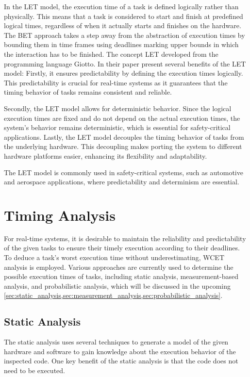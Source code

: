 In the \ac{LET} model, the execution time of a task is defined logically rather than physically. This means that a task is considered to start and finish at predefined logical times, regardless of when it actually starts and finishes on the hardware\cite{chakrabortyAdvancesRealTimeSystems2012}.
The \ac{BET} approach takes a step away from the abstraction of execution times by bounding them in time frames using deadlines marking upper bounds in which the interaction has to be finished\cite{chakrabortyAdvancesRealTimeSystems2012}.
The concept \ac{LET} developed from the programming language Giotto\cite{henzingerGiottoTimetriggeredLanguage2003}.
In their paper \textcite{henzingerGiottoTimetriggeredLanguage2003} present several benefits of the \ac{LET} model:
Firstly, it ensures predictability by defining the execution times logically.
This predictability is crucial for real-time systems as it guarantees that the timing behavior of tasks remains consistent and reliable.

Secondly, the \ac{LET} model allows for deterministic behavior.
Since the logical execution times are fixed and do not depend on the actual execution times, the system's behavior remains deterministic, which is essential for safety-critical applications.
Lastly, the \ac{LET} model decouples the timing behavior of tasks from the underlying hardware.
This decoupling makes porting the system to different hardware platforms easier, enhancing its flexibility and adaptability.

The \ac{LET} model is commonly used in safety-critical systems, such as automotive and aerospace applications, where predictability and determinism are essential.

\section{Timing Analysis}\label{sec:timing_analysis}
For real-time systems, it is desirable to maintain the reliability and predictability of the given tasks to ensure their timely execution according to their deadlines.
To deduce a task's worst execution time without underestimating, \ac{WCET} analysis is employed.
Various approaches are currently used to determine the possible execution times of tasks, including static analysis, measurement-based analysis, and probabilistic analysis, which will be discussed in the upcoming \cref{sec:static_analysis,sec:measurement_analysis,sec:probabilistic_analysis}.

\subsection{Static Analysis}\label{sec:static_analysis}
The static analysis uses several techniques to generate a model of the given hardware and software to gain knowledge about the execution behavior of the inspected code.
One key benefit of the static analysis is that the code does not need to be executed.

